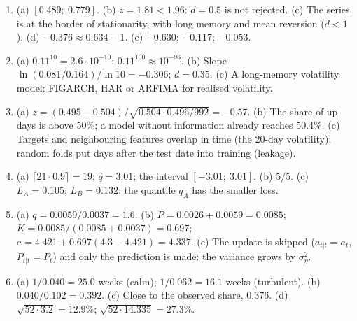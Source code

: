 \documentclass[10.5pt]{article}
\begin{document}
{\begin{enumerate}[label=\textbf{\arabic*.},leftmargin=2.2em,itemsep=0.25ex]
$\mathrm{GS10}=1.276+1.026\,\mathrm{TB3MS}$. (c) The 10-year rate follows the 3-month rate almost one for one, plus a term
premium of about $1.3$ percentage points. (d) $1-0.0174-1.026\cdot 0.0236=0.958$; $16.3$ months. (e) $z=-0.819$. (f) Corrections: $+0.014$ (GS10) and $-0.019$ (TB3MS) percentage points per month.
\item (a) $[0.489;\ 0.779]$. (b) $z=1.81<1.96$: $d=0.5$ is not rejected. (c) The series is at the border of stationarity, with long memory and mean reversion ($d<1$). (d) $-0.376\approx 0.634-1$. (e) $-0.630$; $-0.117$; $-0.053$.
\item (a) $0.11^{10}=2.6\cdot 10^{-10}$; $0.11^{100}\approx 10^{-96}$. (b) Slope $\ln(0.081/0.164)/\ln 10=-0.306$;
$d=0.35$. (c) A long-memory volatility model: FIGARCH, HAR or ARFIMA for realised volatility.
\item (a) $z=(0.495-0.504)/\sqrt{0.504\cdot 0.496/992}=-0.57$. (b) The share of up days is above 50\%; a model without
information already reaches $50.4\%$. (c) Targets and neighbouring features overlap in time (the 20-day volatility);
random folds put days after the test date into training (leakage).
\item (a) $\lceil 21\cdot 0.9\rceil=19$; $\hat q=3.01$; the interval $[-3.01;\ 3.01]$. (b) $5/5$. (c) $L_A=0.105$;
$L_B=0.132$: the quantile $q_A$ has the smaller loss.
\item (a) $q=0.0059/0.0037=1.6$. (b) $P=0.0026+0.0059=0.0085$; $K=0.0085/(0.0085+0.0037)=0.697$;
$a=4.421+0.697(4.3-4.421)=4.337$. (c) The update is skipped ($a_{t|t}=a_t$, $P_{t|t}=P_t$) and only the prediction is
made: the variance grows by $\sigma^2_\eta$.
\item (a) $1/0.040=25.0$ weeks (calm); $1/0.062=16.1$ weeks (turbulent). (b) $0.040/0.102=0.392$. (c) Close to the observed share, $0.376$. (d) $\sqrt{52\cdot 3.2}=12.9\%$; $\sqrt{52\cdot 14.335}=27.3\%$.
\end{enumerate}}
\end{document}
